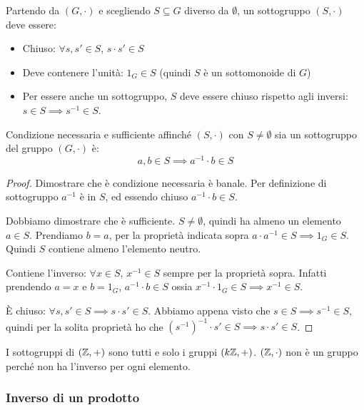 \begin{defn}[Sottogruppo]
Partendo da $(G, \cdot)$ e scegliendo $S \subseteq G$ diverso da $\emptyset$, un sottogruppo $(S, \cdot)$ deve essere:
\begin{itemize}
    \item Chiuso: $\forall s, s' \in S$, $s \cdot s' \in S$
    \item Deve contenere l'unit\`a: $1_G \in S$ (quindi $S$ \`e un sottomonoide di $G$)
    \item Per essere anche un sottogruppo, $S$ deve essere chiuso rispetto agli inversi: $s \in S \implies s^{-1} \in S$.
\end{itemize}
\end{defn}
\begin{prop}
Condizione necessaria e sufficiente affinch\'e $(S, \cdot)$ con $S \neq \emptyset$ sia un sottogruppo del gruppo $(G, \cdot)$ \`e:
\[
a, b \in S \implies a^{-1} \cdot  b \in S
\]
\end{prop}
\begin{proof}
Dimostrare che \`e condizione necessaria \`e banale. Per definizione di sottogruppo $a^{-1}$ \`e in $S$, ed essendo chiuso $a^{-1} \cdot b \in S$.

Dobbiamo dimostrare che \`e sufficiente. $S \neq \emptyset$, quindi ha almeno un elemento $a \in S$. Prendiamo $b = a $, per la propriet\`a indicata sopra $a \cdot a^{-1} \in S \implies 1_G \in S$. Quindi $S$ contiene almeno l'elemento neutro.

Contiene l'inverso: $\forall x \in S $, $ x^{-1} \in S$ sempre per la propriet\`a sopra. Infatti prendendo $a = x$ e $b = 1_G$, $a^{-1} \cdot b \in S$ ossia $x^{-1} \cdot 1_G \in S \implies x^{-1} \in S$.

\`E chiuso: $\forall s, s' \in S \implies s \cdot s' \in S$. Abbiamo appena visto che $s \in S \implies s^{-1} \in S$, quindi per la solita propriet\`a ho che $(s^{-1})^{-1} \cdot s' \in S \implies s \cdot s' \in S$.
\end{proof}


I sottogruppi di $(\mathbb{Z}, +)$ sono tutti e solo i gruppi $(k \mathbb{Z}, +)$. $(\mathbb{Z}, \cdot)$ non \`e un gruppo perch\'e non ha l'inverso per ogni elemento.

\subsubsection{Inverso di un prodotto}

